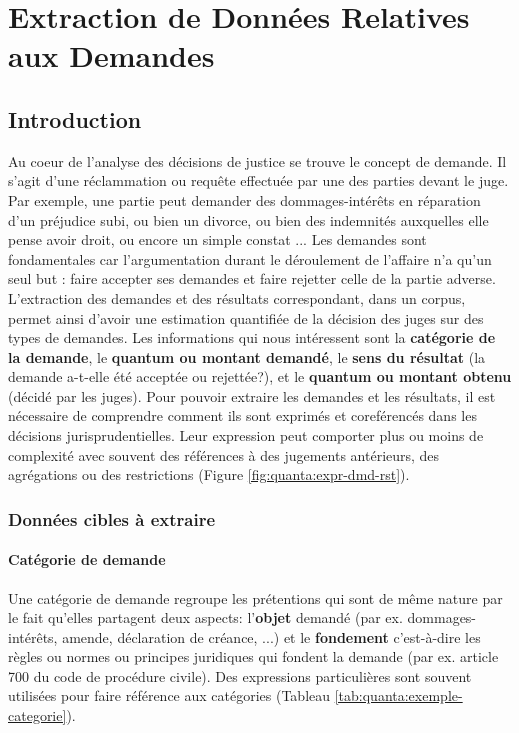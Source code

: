 %
\chapter{Extraction de Données Relatives aux Demandes}
\label{chap:quanta}

\section{Introduction}
\label{sec:quanta:introduction}
Au coeur de l'analyse des décisions de justice se trouve le concept de demande. Il s'agit d'une réclammation ou requête effectuée par une des parties devant le juge. Par exemple, une partie peut demander des dommages-intérêts en réparation d'un préjudice subi, ou bien un divorce, ou bien des indemnités auxquelles elle pense avoir droit, ou encore un simple constat ... Les demandes sont fondamentales car l'argumentation durant le déroulement de l'affaire n'a qu'un seul but : faire accepter ses demandes et faire rejetter celle de la partie adverse. L'extraction des demandes et des résultats correspondant, dans un corpus, permet ainsi d'avoir une estimation quantifiée de la décision des juges sur des types de demandes. Les informations qui nous intéressent sont la \textbf{catégorie de la demande}, le \textbf{quantum ou montant demandé}, le \textbf{sens du résultat} (la demande a-t-elle été acceptée ou rejettée?), et le \textbf{quantum ou montant obtenu} (décidé par les juges). Pour pouvoir extraire les demandes et les résultats, il est nécessaire de comprendre comment ils sont exprimés et coreférencés dans les décisions jurisprudentielles. Leur expression peut comporter plus ou moins de complexité avec souvent des références à des jugements antérieurs, des agrégations ou des restrictions (Figure \ref{fig:quanta:expr-dmd-rst}).

\subsection{Données cibles à extraire}
\subsubsection{Catégorie de demande}
Une catégorie de demande regroupe les prétentions qui sont de même nature par le fait qu'elles partagent deux aspects: l'\textbf{objet} demandé (par ex. dommages-intérêts, amende, déclaration de créance, ...) et le \textbf{fondement} c'est-à-dire les règles ou normes ou principes juridiques qui fondent la demande (par ex. article 700 du code de procédure civile). Des expressions particulières sont souvent utilisées pour faire référence aux catégories (Tableau \ref{tab:quanta:exemple-categorie}).

